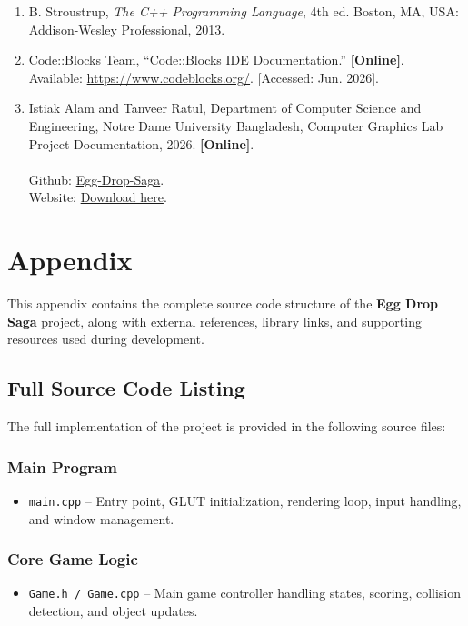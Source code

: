 \documentclass[12pt,a4paper]{report}
\begin{document}
\begin{enumerate}
\item B. Stroustrup, \textit{The C++ Programming Language}, 4th ed. Boston, MA, USA: Addison-Wesley Professional, 2013.

\item Code::Blocks Team, ``Code::Blocks IDE Documentation.'' \textbf{[Online]}.\\ Available: \href{https://www.codeblocks.org/}{https://www.codeblocks.org/}. [Accessed: Jun. 2026].

\item Istiak Alam and Tanveer Ratul, Department of Computer Science and Engineering, Notre Dame University Bangladesh, Computer Graphics Lab Project Documentation, 2026. 
\textbf{[Online]}.\\ \\ Github: \href{https://github.com/Istiaq-Alam/Egg-Drop-Saga.git}{Egg-Drop-Saga}. \\
Website: \href{https://egg-drop-saga.vercel.app/}{Download here}.

\end{enumerate}






\chapter*{\center Appendix}


This appendix contains the complete source code structure of the \textbf{Egg Drop Saga} project, along with external references, library links, and supporting resources used during development.


\section{Full Source Code Listing}

The full implementation of the project is provided in the following source files:

\subsection{Main Program}
\begin{itemize}
    \item \texttt{main.cpp} – Entry point, GLUT initialization, rendering loop, input handling, and window management.
\end{itemize}

\subsection{Core Game Logic}
\begin{itemize}
    \item \texttt{Game.h / Game.cpp} – Main game controller handling states, scoring, collision detection, and object updates.
\end{itemize}
\end{document}
